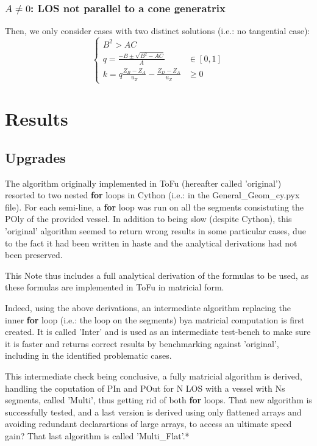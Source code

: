 \documentclass[a4paper,11pt,twoside,titlepage,openright]{book}
\numberwithin{equation}{section}
\begin{document}
\subsection{$A\neq 0$: LOS not parallel to a cone generatrix}

Then, we only consider cases with two distinct solutions (i.e.: no tangential case):
$$
\left\{
\begin{array}{ll}
B^2 > AC\\
q = \frac{-B \pm \sqrt{B^2-AC}}{A} & \in [0,1]\\
k = q\frac{Z_B-Z_A}{u_Z} - \frac{Z_D-Z_A}{u_Z} & \geq 0
\end{array}
\right.
$$



\chapter{Results}

\section{Upgrades}

The algorithm originally implemented in ToFu (hereafter called 'original') resorted to two nested \textbf{for} loops in Cython (i.e.: in the General\_Geom\_cy.pyx file). 
For each semi-line, a \textbf{for} loop was run on all the segments consistuting the POly of the provided vessel.
In addition to being slow (despite Cython), this 'original' algorithm seemed to return wrong results in some particular cases, due to the fact it had been written in haste and the analytical derivations had not been preserved.

This Note thus includes a full analytical derivation of the formulas to be used, as these formulas are implemented in ToFu in matricial form.

Indeed, using the above derivations, an intermediate algorithm replacing the inner \textbf{for} loop (i.e.: the loop on the segments) bya matricial computation is first created. It is called 'Inter' and is used as an intermediate test-bench to make sure it is faster and returns correct results by benchmarking against 'original', including in the identified problematic cases.

This intermediate check being conclusive, a fully matricial algorithm is derived, handling the coputation of PIn and POut for N LOS with a vessel with Ns segments, called 'Multi', thus getting rid of both \textbf{for} loops.
That new algorithm is successfully tested, and a last version is derived using only flattened arrays and avoiding redundant declarartions of large arrays, to access an ultimate speed gain? That last algorithm is called 'Multi\_Flat'.*
\end{document}
